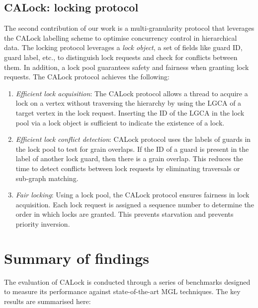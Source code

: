 \subsection{CALock: locking protocol}

The second contribution of our work is a multi-granularity protocol that leverages the CALock labelling scheme to optimise concurrency control in hierarchical data. The locking protocol leverages a \emph{lock object}, a set of fields like guard ID, guard label, etc., to distinguish lock requests and check for conflicts between them. In addition, a lock pool guarantees safety and fairness when granting lock requests. The CALock protocol achieves the following:
\begin{enumerate}
    \item \emph{Efficient lock acquisition}: The CALock protocol allows a thread to acquire a lock on a vertex without traversing the hierarchy by using the LGCA of a target vertex in the lock request. Inserting the ID of the LGCA in the lock pool via a lock object is sufficient to indicate the existence of a lock.
    \item \emph{Efficient lock conflict detection}: CALock protocol uses the labels of guards in the lock pool to test for grain overlaps. If the ID of a guard is present in the label of another lock guard, then there is a grain overlap. This reduces the time to detect conflicts between lock requests by eliminating traversals or sub-graph matching. 
    \item \emph{Fair locking}: Using a lock pool, the CALock protocol ensures fairness in lock acquisition. Each lock request is assigned a sequence number to determine the order in which locks are granted. This prevents starvation and prevents priority inversion.
\end{enumerate}




\section{Summary of findings}
The evaluation of CALock is conducted through a series of benchmarks designed to measure its performance against state-of-the-art MGL techniques. The key results are summarised here:

